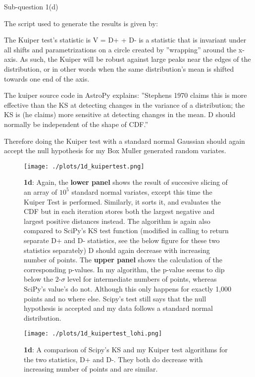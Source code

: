 \begin{subsection}{Sub-question 1(d)}

The script used to generate the results is given by:
  



The Kuiper test's statistic is V = D+ + D- is a statistic that is invariant under all shifts
and parametrizations on a circle created by ''wrapping'' around the x-axis. As such, the Kuiper will be robust against large peaks near the edges of the distribution, or in other words when the same distribution's mean is shifted towards one end of the axis.

The kuiper source code in AstroPy explains: ''Stephens 1970 claims this is more effective than the KS at detecting changes in the variance of a distribution; the KS is (he claims) more sensitive at detecting changes in the mean. D should normally be independent of the shape of CDF.''

Therefore doing the Kuiper test with a standard normal Gaussian should again accept the null hypothesis for my Box Muller generated random variates.


\begin{figure}[h!]
  \centering
  \texttt{[image: ./plots/1d\_kuipertest.png]}
  \caption{\textbf{1d}: Again, the \textbf{lower panel} shows the result of succesive slicing of an array of $10^5$ standard normal variates, except this time the Kuiper Test is performed. Similarly, it sorts it, and evaluates the CDF but in each iteration stores both the largest negative and largest positive distances instead. The algorithm is again also compared to SciPy's KS test function (modified in calling to return separate D+ and D- statistics, see the below figure for these two statistics separately) D should again decrease with increasing number of points. The \textbf{upper panel} shows the calculation of the corresponding p-values. In my algorithm, the p-value seems to dip below the 2-$\sigma$ level for intermediate numbers of points, whereas SciPy's value's do not. Although this only happens for exactly 1,000 points and no where else. Scipy's test still says that the null hypothesis is accepted and my data follows a standard normal distribution.}
  \label{fig:kuipertest}
\end{figure}



\begin{figure}[h!]
  \centering
  \texttt{[image: ./plots/1d\_kuipertest\_lohi.png]}
  \caption{\textbf{1d}: A comparison of Scipy's KS and my Kuiper test algorithms for the two statistics, D+ and D-. They both do decrease with increasing number of points and are similar.}
  \label{fig:kuipertest2}
\end{figure}


\end{subsection}


